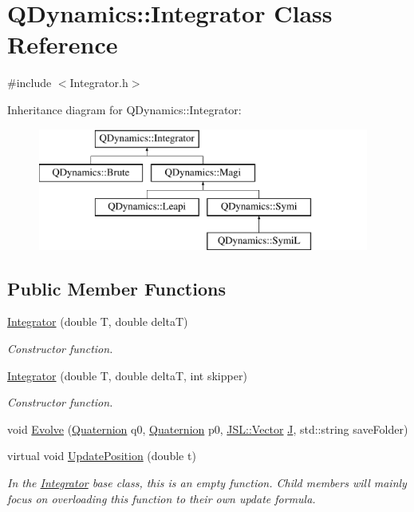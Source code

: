 \hypertarget{classQDynamics_1_1Integrator}{}\section{Q\+Dynamics\+:\+:Integrator Class Reference}
\label{classQDynamics_1_1Integrator}


{\ttfamily \#include $<$Integrator.\+h$>$}

Inheritance diagram for Q\+Dynamics\+:\+:Integrator\+:\begin{figure}[H]
\begin{center}
\leavevmode
\includegraphics[height=4.000000cm]{classQDynamics_1_1Integrator}
\end{center}
\end{figure}
\subsection*{Public Member Functions}
\begin{DoxyCompactItemize}
\item 
\hyperlink{classQDynamics_1_1Integrator_a677dd555cee316d6d456b7da258c4385}{Integrator} (double T, double deltaT)
\begin{DoxyCompactList}\small\item\em Constructor function. \end{DoxyCompactList}\item 
\hyperlink{classQDynamics_1_1Integrator_aa469124cb408fadbaa540555dfabee33}{Integrator} (double T, double deltaT, int skipper)
\begin{DoxyCompactList}\small\item\em Constructor function. \end{DoxyCompactList}\item 
void \hyperlink{classQDynamics_1_1Integrator_a4b921b312775194b77c2c85f93add84e}{Evolve} (\hyperlink{classQDynamics_1_1Quaternion}{Quaternion} q0, \hyperlink{classQDynamics_1_1Quaternion}{Quaternion} p0, \hyperlink{classJSL_1_1Vector}{J\+S\+L\+::\+Vector} \hyperlink{classQDynamics_1_1Integrator_a7b99b22475321b34c1624bded3489954}{J}, std\+::string save\+Folder)
\item 
virtual void \hyperlink{classQDynamics_1_1Integrator_a4effa27d56f3205e53653b1fdc5cd08e}{Update\+Position} (double t)
\begin{DoxyCompactList}\small\item\em In the \hyperlink{classQDynamics_1_1Integrator}{Integrator} base class, this is an empty function. Child members will mainly focus on overloading this function to their own update formula. \end{DoxyCompactList}\end{DoxyCompactItemize}
